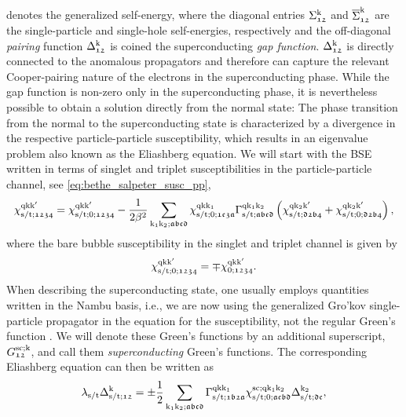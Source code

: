 \documentclass[../../main.tex]{subfiles}
\begin{document}
denotes the generalized self-energy, where the diagonal entries $\Sigma_{\mathfrak{12}}^{\text{k}}$ and $\overline{\Sigma}_{\mathfrak{12}}^{\text{k}}$ are the single-particle and single-hole self-energies, respectively and the off-diagonal \textit{pairing} function $\Delta_{\mathfrak{12}}^{\text{k}}$ is coined the superconducting \textit{gap function}. $\Delta_{\mathfrak{12}}^{\text{k}}$ is directly connected to the anomalous propagators and therefore can capture the relevant Cooper-pairing nature of the electrons in the superconducting phase. While the gap function is non-zero only in the superconducting phase, it is nevertheless possible to obtain a solution directly from the normal state: The phase transition from the normal to the superconducting state is characterized by a divergence in the respective particle-particle susceptibility, which results in an eigenvalue problem also known as the Eliashberg equation. We will start with the BSE written in terms of singlet and triplet susceptibilities in the particle-particle channel, see \eqref{eq:bethe_salpeter_susc_pp},
\begin{align}
\chi^{\text{q}\text{k}\text{k}'}_{\text{s}/\text{t};\mathfrak{1234}}=\chi^{\text{q}\text{k}\text{k}'}_{\text{s}/\text{t};0;\mathfrak{1234}}-\frac{1}{2\beta^2}\sum_{\text{k}_1\text{k}_2;\mathfrak{abcd}}\chi^{\text{q}\text{k}\text{k}_1}_{\text{s}/\text{t};0;\mathfrak{1c3a}}\Gamma^{\text{q}\text{k}_1\text{k}_2}_{\text{s}/\text{t};\mathfrak{abcd}}\left (\chi^{\text{q}\text{k}_2\text{k}'}_{\text{s}/\text{t};\mathfrak{d2b4}}+\chi^{\text{q}\text{k}_2\text{k}'}_{\text{s}/\text{t};0;\mathfrak{d2b4}}\right ),
\end{align}
where the bare bubble susceptibility in the singlet and triplet channel is given by
\begin{align}
	\chi^{\text{q}\text{k}\text{k}'}_{\text{s}/\text{t};0;\mathfrak{1234}}=\mp\chi^{\text{q}\text{k}\text{k}'}_{0;\mathfrak{1234}}.
\end{align}
When describing the superconducting state, one usually employs quantities written in the Nambu basis, i.e., we are now using the generalized Gro'kov single-particle propagator in the equation for the susceptibility, not the regular Green's function \cite{Nambu paper, Putzer DA}. We will denote these Green's functions by an additional superscript, $G^{\text{sc};\text{k}}_{\mathfrak{12}}$, and call them \textit{superconducting} Green's functions. The corresponding Eliashberg equation can then be written as
\begin{align}\label{eq:full_eliashberg}
	\lambda_{\text{s}/\text{t}}\Delta_{\text{s}/\text{t};\mathfrak{12}}^{\text{k}}=\pm\frac{1}{2}\sum_{\text{k}_1\text{k}_2;\mathfrak{abcd}}\Gamma^{\text{q}\text{k}\text{k}_1}_{\text{s}/\text{t};\mathfrak{1b2a}}\chi^{\text{sc};\text{q}\text{k}_1\text{k}_2}_{\text{s}/\text{t};0;\mathfrak{acbd}}\Delta_{\text{s}/\text{t};\mathfrak{dc}}^{\text{k}_2},
\end{align}
\end{document}
